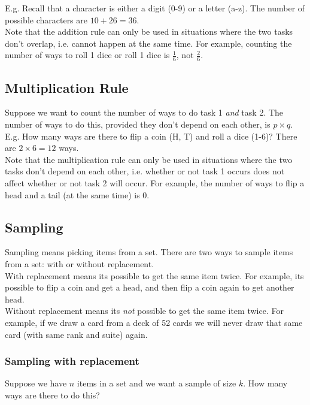 \documentclass[12pt, letterpaper]{article}
\begin{document}
E.g. Recall that a character is either a digit (0-9) or a letter (a-z). The number of possible characters are \( 10 + 26 = 36\).\\

Note that the addition rule can only be used in situations where the two tasks don't overlap, i.e. cannot happen at the same time. For example, counting the number of ways to roll 1 dice or roll 1 dice is \( \frac{1}{6} \), not \( \frac{2}{6} \).

\subsection{Multiplication Rule}
Suppose we want to count the number of ways to do task 1 \emph{and} task 2. The number of ways to
do this, provided they don't depend on each other, is \(p \times q\).\\

E.g. How many ways are there to flip a coin (H, T) and roll a dice (1-6)?
There are \(2 \times 6 = 12\) ways.\\

Note that the multiplication rule can only be used in situations where the two tasks don't depend on each other, i.e. whether or not task 1 occurs does not affect whether or not task 2 will occur. For example, the number of ways to flip a head and a tail (at the same time) is 0.

\subsection{Sampling}
Sampling means picking items from a set. There are two ways to sample items from a set: with or without replacement.\\

With replacement means its possible to get the same item twice. For example, its possible to flip a coin and get a head, and then flip a coin again to get another head.\\

Without replacement means its \emph{not} possible to get the same item twice. For example, if we draw a card from a deck of 52 cards we will never draw that same card (with same rank and suite) again.

\subsubsection{Sampling with replacement}
Suppose we have \(n\) items in a set and we want a sample of size \(k\). How many ways are there to do this?\\
\end{document}
